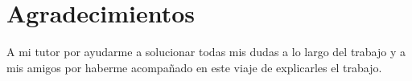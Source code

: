 

\chapter{Agradecimientos}

A mi tutor por ayudarme a solucionar todas mis dudas a lo largo del trabajo y a mis amigos por haberme acompañado en este viaje de explicarles el trabajo.

\cleardoublepage
\endinput
